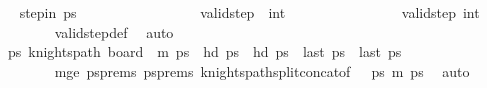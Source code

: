 \begin{isabellebody}
\ \isamarkupfalse%
\ {\isachardoublequoteopen}step{\isacharunderscore}{\kern0pt}in\ {\isacharquery}{\kern0pt}ps\ {\isacharparenleft}{\kern0pt}{}{\isacharcomma}{\kern0pt}{}{\isacharparenright}{\kern0pt}\ {\isacharparenleft}{\kern0pt}{}{\isacharcomma}{\kern0pt}{}{\isacharparenright}{\kern0pt}{\isachardoublequoteclose}\ \isanewline
\ \ \ \ \ \ \ \ \ \ \ \ \ \ {\isachardoublequoteopen}valid{\isacharunderscore}{\kern0pt}step\ {\isacharparenleft}{\kern0pt}{}{\isacharcomma}{\kern0pt}{}{\isacharparenright}{\kern0pt}\ {\isacharparenleft}{\kern0pt}{}{\isacharcomma}{\kern0pt}int\ {}{\isacharplus}{\kern0pt}{}{\isacharparenright}{\kern0pt}{\isachardoublequoteclose}\ \isanewline
\ \ \ \ \ \ \ \ \ \ \ \ \ \ {\isachardoublequoteopen}valid{\isacharunderscore}{\kern0pt}step\ {\isacharparenleft}{\kern0pt}{}{\isacharcomma}{\kern0pt}int\ {}{\isacharplus}{\kern0pt}{}{\isacharparenright}{\kern0pt}\ {\isacharparenleft}{\kern0pt}{}{\isacharcomma}{\kern0pt}{}{\isacharparenright}{\kern0pt}{\isachardoublequoteclose}\isanewline
\ \ \ \ \ \ \isamarkupfalse%
\ valid{\isacharunderscore}{\kern0pt}step{\isacharunderscore}{\kern0pt}def\ \isamarkupfalse%
\ auto\isanewline
\ \ \ \ \isamarkupfalse%
\ \isamarkupfalse%
\ {\isachardoublequoteopen}{\isasymexists}ps{\isachardot}{\kern0pt}\ knights{\isacharunderscore}{\kern0pt}path\ {\isacharparenleft}{\kern0pt}board\ {}\ m{\isacharparenright}{\kern0pt}\ ps\ {\isasymand}\ hd\ ps\ {\isacharequal}{\kern0pt}\ hd\ {\isacharquery}{\kern0pt}ps\ {\isasymand}\ last\ ps\ {\isacharequal}{\kern0pt}\ last\ {\isacharquery}{\kern0pt}ps\ \ \ \ \ \ \ \ \ \ \ \ \ \ \isanewline
\ \ \ \ \ \ \isamarkupfalse%
\ m{\isacharunderscore}{\kern0pt}ge\ psprems\ ps{}{\isacharunderscore}{\kern0pt}prems\ knights{\isacharunderscore}{\kern0pt}path{\isacharunderscore}{\kern0pt}split{\isacharunderscore}{\kern0pt}concat{\isacharbrackleft}{\kern0pt}of\ {}\ {}\ {\isacharquery}{\kern0pt}ps\ {\isachardoublequoteopen}m{\isacharminus}{\kern0pt}{}{\isachardoublequoteclose}\ ps\ \isamarkupfalse%
\ auto\isanewline

\end{isabellebody}
